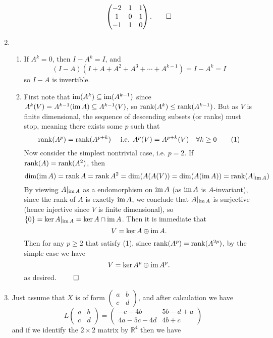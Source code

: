 \begin{enumerate}
\begin{enumerate}[label=(\arabic*)]
\[\begin{pmatrix}
        -2 & 1 & 1 \\
        1 & 0 & 1 \\
        -1 & 1 & 0
        \end{pmatrix}
        . \qed\]
    \end{enumerate}
    \item
    \begin{enumerate}[label=(\arabic*)]
        \item If $A^k = 0$, then $I - A^k = I$, and 
        \[
        (I-A)(I+A+A^2+A^3+\cdots+A^{k-1}) = I - A^k = I
        \]
        so $I-A$ is invertible.
        \item First note that $\operatorname{im}(A^{k}) \subseteq \operatorname{im}(A^{k-1})$ since $A^k(V) = A^{k-1}(\operatorname{im} A) \subseteq A^{k-1}(V)$, so $\operatorname{rank} (A^{k}) \leq \operatorname{rank}(A^{k-1})$. But as $V$ is finite dimensional, the sequence of descending subsets (or ranks) must stop, meaning there exists some $p$ such that
        \[
        \operatorname{rank} (A^{p}) = \operatorname{rank}(A^{p+k}) \quad \text{ i.e. } A^p(V) = A^{p+k}(V) \quad \forall k \geq 0 \tag{1}
        \]
        Now consider the simplest nontrivial case, i.e. $p = 2$. If $\operatorname{rank}(A) = \operatorname{rank}(A^2)$, then 
        \[
        \dim(\operatorname{im} A) = \operatorname{rank} A = \operatorname{rank} A^2 = \dim(A(A(V)) = \dim(A(\operatorname{im} A)) = \operatorname{rank}( A\vert_{\operatorname{im} A})
        \]
        By viewing $A\vert_{\operatorname{im} A}$ as a endomorphism on $\operatorname{im} A$ (as $\operatorname{im} A$ is $A$-invariant), since the rank of $A$ is exactly $\operatorname{im} A$, we conclude that $A\vert_{\operatorname{im} A}$ is surjective (hence injective since $V$ is finite dimensional), so $\{0\} = \ker A\vert_{\operatorname{im} A} = \ker A \cap \operatorname{im} A$. Then it is immediate that
        \[
        V = \ker A \oplus \operatorname{im} A.
        \]
        Then for any $p \geq 2$ that satisfy (1), since $\operatorname{rank} (A^{p}) = \operatorname{rank}(A^{2p})$, by the simple case we have
        \[
        V = \ker A^p \oplus \operatorname{im} A^p.
        \]
        as desired. $\qed$
    \end{enumerate}
    \item
    Just assume that $X$ is of form $\begin{pmatrix} a & b \\ c & d \end{pmatrix}$, and after calculation we have
    \[
    L\begin{pmatrix} a & b \\ c & d \end{pmatrix} = \begin{pmatrix} -c-4b & 5b-d+a \\ 4a-5c-4d & 4b+c \end{pmatrix}
    \]
    and if we identify the $2 \times 2$ matrix by $\mathbb{R}^4$ then we have

\end{enumerate}
